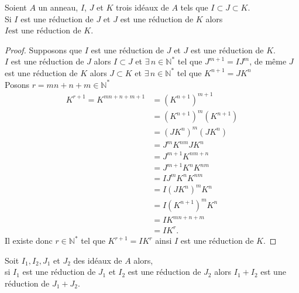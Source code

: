 \begin{maproposition}
	Soient $A$ un anneau, $I$, $J$ et $K$ trois id\'eaux de $A$ tels que 
	$I \subset J \subset K $.\\ Si $I$ est une réduction de $J$ et $J$ est une réduction de $K$ alors $ I \text{est une réduction de }  K $.
\end{maproposition}
\begin{proof}
	Supposons que $I$ est une réduction de $J$ et $J$ est une réduction de $K$.\\
	$I$ est une réduction de $J$ alors $I \subset J$ et $\exists \, n\in \mathbb{N}^{*}$ tel que $J^{m+1} = IJ^{m}$, de même $J$ est une réduction de $K$ alors $J \subset K$ et $\exists \, n\in \mathbb{N}^{*}$ tel que $K^{n+1} = JK^{n}$\\
	Posons $r = mn+n+m \in \mathbb{N}^{*}$
	\begin{align*}
		K^{r+1} = K^{mn+n+m+1}& = (K^{n+1})^{m+1}\\
		& = (K^{n+1})^{m}(K^{n+1})\\
		& = (JK^{n})^{m}(JK^{n})\\
		& = J^{m}K^{nm}JK^{n}\\
		& = J^{m+1}K^{nm+n}\\
		& = J^{m+1}K^{n}K^{nm}\\
		& = IJ^{m}K^{n}K^{nm}\\
		& = I(JK^{n})^{m}K^{n}\\
		& = I(K^{n+1})^{m}K^{n}\\
		& = IK^{mn+n+m}  \\
		& = IK^r.          
	\end{align*}
	Il existe donc $r\in \mathbb{N}^{*}$ tel que $K^{r+1} = IK^{r}$ ainsi $I$ est une réduction de $K$.
\end{proof}
\begin{monlemme}
	Soit $I_1, I_2, J_1$ et $J_2$ des idéaux de $A$ alors, \\ si $I_1$ est  une réduction de $J_1$ et $I_2$ est une réduction de $J_2$ alors $I_1+I_2$ est une réduction de $J_1+J_2$.
\end{monlemme}
